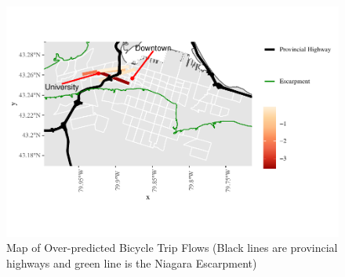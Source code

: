 \documentclass[smallextended]{svjour3}       %
\begin{document}
\begin{figure}
\centering
\includegraphics{Correlates-cycling-flows-routes_files/figure-latex/residuals-over-1.pdf}
\caption{\label{fig:residuals-overestimated} Map of Over-predicted
Bicycle Trip Flows (Black lines are provincial highways and green line
is the Niagara Escarpment)}
\end{figure}
\end{document}
